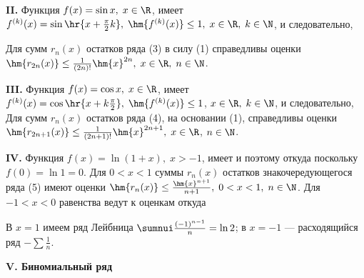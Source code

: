 \documentclass[a4paper]{article}
\begin{document}
\textbf{II.} Функция $f(x)=\sin x, \; x\in\R$, имеет
$f^{(k)}(x)=\sin\hr{x+\frac{\pi}2k}, \; \hm{f^{(k)}(x)}\le1, \;
x\in\R, \; k\in\N$, и следовательно, 

Для сумм $r_n(x)$ остатков ряда (3) в силу (1) справедливы оценки
$\hm{r_{2n}(x)} \le \frac1{(2n)!} \hm{x}^{2n}, \; x\in\R, \;
n\in\N$.

\textbf{III.} Функция $f(x)=\cos x, \; x\in\R$, имеет $f^{(k)}(x) =
\cos\hr{x+k\frac{\pi}2}, \; \hm{f^{(k)}(x)}\le1$, $x\in\R, \;
k\in\N$, и следовательно,  Для сумм $r_n(x)$ остатков ряда (4), на
основании (1), справедливы оценки $\hm{r_{2n+1}(x)} \le
\frac1{(2n+1)!} \hm{x}^{2n+1}, \; x\in\R$, $n\in\N$.

\textbf{IV.} Функция $f(x)=\ln(1+x), \; x>-1$, имеет
 и поэтому 
откуда 
поскольку $f(0)=\ln1=0$. Для $0<x<1$ суммы $r_n(x)$ остатков
знакочередующегося ряда (5) имеют оценки $\hm{r_n(x)} \le
\frac{\hm{x}^{n+1}}{n+1}, \; 0<x<1, \; n\in\N$. Для $-1<x<0$
равенства  ведут к
оценкам  откуда 

В $x=1$ имеем ряд Лейбница $\sumnui \frac{(-1)^{n-1}}{n}=\ln2$; в
$x=-1$ --- расходящийся ряд $-\sum\frac1n$.

\textbf{V. Биномиальный ряд}
\end{document}
